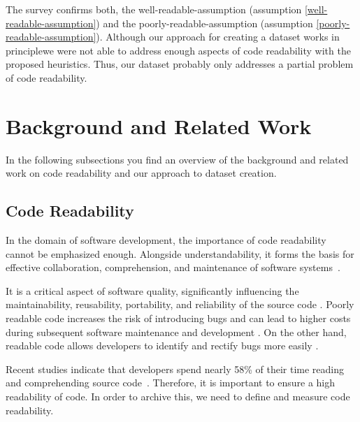 \documentclass[%
class=scrreprt,
chapterprefix=false,%
open=right,%
twoside=false,%
paper=a4,%
logofile={Logo\_zentral\_farbig\_EN.png},%
thesistype=master,%
UKenglish,%
]{se2thesis}
\theoremstyle{definition}
\begin{document}
	The survey confirms both, the well-readable-assumption (assumption \ref{well-readable-assumption}) and the poorly-readable-assumption (assumption \ref{poorly-readable-assumption}). Although our approach for creating a dataset works in principlewe were not able to address enough aspects of code readability with the proposed heuristics. Thus, our dataset probably only addresses a partial problem of code readability.
		
\section{Background and Related Work} \label{Background and Related Work}
	In the following subsections you find an overview of the background and related work on code readability and our approach to dataset creation.
	
\subsection{Code Readability} \label{Code Readability}
		
	In the domain of software development, the importance of code readability cannot be emphasized enough. Alongside understandability, it forms the basis for effective collaboration, comprehension, and maintenance of software systems~\cite{posnett2011simpler, aggarwal2002integrated}.
	
	It is a critical aspect of software quality, significantly influencing the maintainability, reusability, portability, and reliability of the source code \cite{alawad2019empirical, sedano2016code}. Poorly readable code increases the risk of introducing bugs \cite{mannan2018towards, scalabrino2018comprehensive} and can lead to higher costs during subsequent software maintenance and development \cite{johnson2019empirical}. On the other hand, readable code allows developers to identify and rectify bugs more easily \cite{mi2023graph}.
	
	Recent studies indicate that developers spend nearly 58\% of their time reading and comprehending source code~\cite{buse2009learning, deimel1985uses, rugaber2000use, boehm2001defect, tashtoush2013impact, sedano2016code, xia2017measuring}.
	Therefore, it is important to ensure a high readability of code. In order to archive this, we need to define and measure code readability.
	
\end{document}
